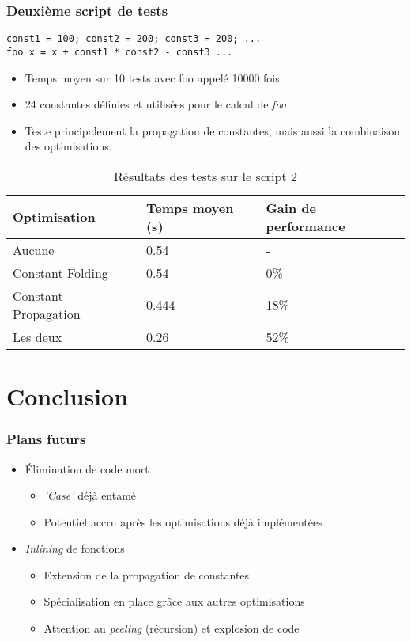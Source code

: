 \documentclass{beamer}
\begin{document}
\begin{frame}
    \frametitle{Deuxième script de tests}
    \texttt{const1 = 100; const2 = 200; const3 = 200; ...\\
    foo x = x + const1 * const2 - const3 ...}\\
    \bigskip
    \begin{itemize}
      \item Temps moyen sur 10 tests avec foo appelé 10000 fois
      \item 24 constantes définies et utilisées pour le calcul de \emph{foo}
      \item Teste principalement la propagation de constantes, mais aussi la
        combinaison des optimisations
    \end{itemize}

    \begin{table}
      \begin{tabular}{l l l}
        \toprule
        \textbf{Optimisation} & \textbf{Temps moyen (s)} & \textbf{Gain de performance}\\
        \midrule
        Aucune & 0.54 & - \\
        Constant Folding & 0.54 & 0\% \\
        Constant Propagation & 0.444 & 18\% \\
        Les deux & 0.26 & 52\% \\
        \bottomrule
      \end{tabular}
      \caption{Résultats des tests sur le script 2}
    \end{table}
\end{frame}
\section{Conclusion}
\begin{frame}
\frametitle{Plans futurs}

  \begin{itemize}
    \item Élimination de code mort
      \begin{itemize}
      \item \emph{'Case'} déjà entamé
        \item Potentiel accru après les optimisations déjà implémentées
      \end{itemize}
    \bigskip
    \pause
    \item \emph{Inlining} de fonctions
      \begin{itemize}
        \item Extension de la propagation de constantes
        \item Spécialisation en place grâce aux autres optimisations
        \item Attention au \emph{peeling} (récursion) et explosion de code
      \end{itemize}
  \end{itemize}
\end{frame}
\end{document}
